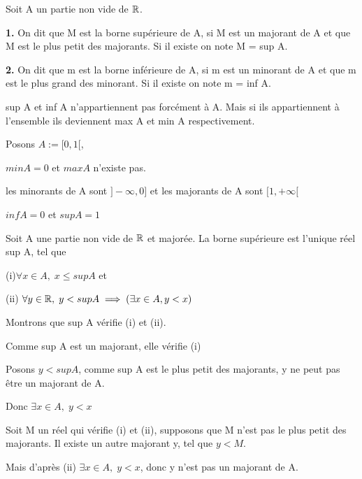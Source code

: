 \documentclass[a4paper, 12pt]{article}
\begin{document}
\begin{definition}
    Soit A un partie non vide de $\mathbb{R}$.

    \item \textbf{1.} On dit que M est la borne supérieure de A, si M est un majorant de A et que M est le plus petit des majorants.
        Si il existe on note M = sup A.
    \item \textbf{2.} On dit que m est la borne inférieure de A, si m est un minorant de A et que m est le plus grand des minorant.
        Si il existe on note m = inf A.
\end{definition}

\begin{remark}
    sup A et inf A n'appartiennent pas forcément à A. Mais si ils appartiennent à l'ensemble ils deviennent max A et min A respectivement.
\end{remark}

\begin{example}
    Posons $A := [0, 1[$,

    $min A = 0$ et $max A$ n'existe pas.

    les minorants de A sont $]-\infty, 0]$ et les majorants de A sont $[1, +\infty[$
    
    $inf A = 0$ et $sup A = 1$
\end{example}

\begin{proposition}
    Soit A une partie non vide de $\mathbb{R}$ et majorée. La borne supérieure est l'unique réel sup A, tel que
    
    \item (i)$\forall x \in A, \; x \leq sup A$ et
    \item (ii) $\forall y \in \mathbb{R}, \; y < sup A \implies (\exists x \in A, y < x)$
\end{proposition}

\begin{demonstration}
    Montrons que sup A vérifie (i) et (ii).

    \begin{rdem}
        Comme sup A est un majorant, elle vérifie (i)
    \end{rdem}

    Posons $y \lt sup A$, comme sup A est le plus petit des majorants, y ne peut pas être un majorant de A.
    
    \begin{rdem}
        Donc $\exists x \in A, \; y < x$
    \end{rdem}

    Soit M un réel qui vérifie (i) et (ii), supposons que M n'est pas le plus petit des majorants.
    Il existe un autre majorant y, tel que $y \lt M$.

    \begin{rdem}
        Mais d'après (ii) $\exists x \in A, \; y < x$, donc y n'est pas un majorant de A.
    \end{rdem}
\end{demonstration}
\end{document}
